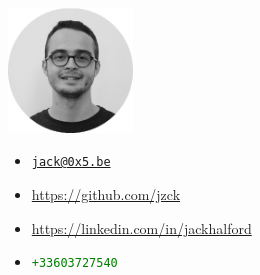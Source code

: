\begin{minipage}{.25\textwidth}
\includegraphics[width=33mm]{img/jack}
\end{minipage}
\begin{minipage}{.25\textwidth}
\end{minipage}
\begin{minipage}{.60\textwidth}
\begin{itemize}
    \renewcommand\labelitemi{}
    \item \large{\faEnvelope} \textcolor{orange}{\href{mailto:jack+cv@0x5.be}{\texttt{jack@0x5.be}}}
    \item \large{\faGithub} \textcolor{magenta}{\url{https://github.com/jzck}}
    \item \large{\faLinkedin} \textcolor{cyan}{\url{https://linkedin.com/in/jackhalford}}
    \item \large{\faPhone} \textcolor{green}{\texttt{+33603727540}}
\end{itemize}
\end{minipage}
